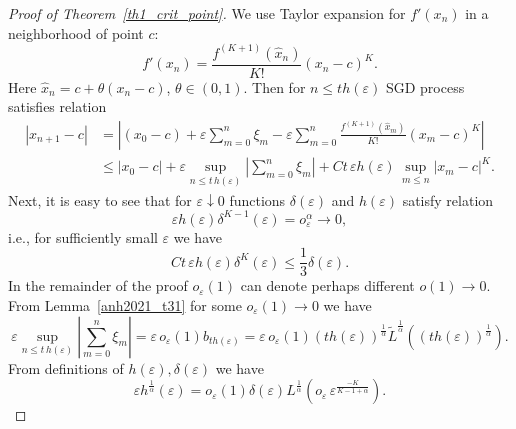 \documentclass{article}
\theoremstyle{plain}
\theoremstyle{definition}
\theoremstyle{remark}
\newcommand{\ra }{ \rightarrow} %
\begin{document}
\begin{proof}[Proof of Theorem~\ref{th1_crit_point}]
We use Taylor expansion for $f'(x_n)$ in a neighborhood of point $c:$
\begin{equation*}
    f'(x_n) = \frac{f^{(K+1)}(\widehat{x}_n)}{K!} (x_n-c)^K.
\end{equation*}
Here $\widehat{x}_n  = c + \theta (x_n -c)$, $\theta \in (0,1).$ Then for $n \leqslant t h(\varepsilon)$  SGD process satisfies relation 
\begin{equation}\label{eq_crit_esc_1}
\begin{split}
    |x_{n+1} - c| & = \left| (x_0 - c) + \varepsilon \sum_{m=0}^n \xi_m  - \varepsilon \sum_{m=0}^n \frac{f^{(K+1)}(\widehat{x}_m)}{K!} (x_m-c)^K\right| \\
    & \leqslant |x_0 - c| + \varepsilon 
    \sup_{n\leqslant t\, h(\varepsilon)}\left|\sum_{m=0}^n \xi_m \right| + C t\,\varepsilon h(\varepsilon)\,\sup\limits_{m \leqslant n} |x_m - c |^K.
\end{split}
\end{equation}
Next, it is easy to see that for $\varepsilon \downarrow 0$ functions $\delta(\varepsilon)$ and $ h(\varepsilon)$ satisfy relation
\begin{equation*}
    \varepsilon h(\varepsilon) \delta^{K-1}(\varepsilon) = o_{\varepsilon}^{\alpha} \ra 0, 
\end{equation*}
i.e., for sufficiently small $\varepsilon$ we have 
\begin{equation}\label{eq_crit_esc_2}
   Ct\,\varepsilon h(\varepsilon) \delta^{K}(\varepsilon)  \leqslant \frac{1}{3} \delta(\varepsilon).
\end{equation}
In the remainder of the proof $o_{\varepsilon}(1)$ can denote perhaps different $o(1) \ra 0.$
From Lemma~\ref{anh2021_t31} for some $o_{\varepsilon}(1) \ra 0$ we have
\begin{equation*}
    \varepsilon  \sup_{n\leqslant t\, h(\varepsilon)}\left|\sum_{m=0}^n \xi_m \right|   = \varepsilon \, o_{\varepsilon}(1) b_{th(\varepsilon)} = \varepsilon \, o_{\varepsilon}(1) (t h(\varepsilon))^{\frac{1}{\alpha}} \widetilde{L} ^{\frac{1}{\alpha}} \left( (t h(\varepsilon))^{\frac{1}{\alpha}}\right).
\end{equation*}
From definitions of $h(\varepsilon), \delta(\varepsilon)$ we have
\begin{equation*}
    \varepsilon h^{\frac{1}{\alpha}}(\varepsilon) = o_{\varepsilon}\left( 1\right) \delta(\varepsilon) L^{\frac{1}{\alpha}}\left(o_{\varepsilon}\,\varepsilon^{\frac{-K}{K-1+\alpha}}\right).

\end{equation*}
\end{proof}
\end{document}
